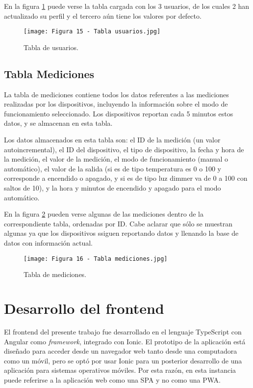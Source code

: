 En la figura \ref{fig:15} puede verse la tabla cargada con los 3 usuarios, de los cuales 2 han actualizado su perfil y el tercero aún tiene los valores por defecto.

\begin{figure}[h]
\centering
\texttt{[image: Figura 15 - Tabla usuarios.jpg]}
\caption[Tabla usuarios]{Tabla de usuarios.}
\label{fig:15}
\end{figure}

\subsection{Tabla Mediciones}

La tabla de mediciones contiene todos los datos referentes a las mediciones realizadas por los dispositivos, incluyendo la información sobre el modo de funcionamiento seleccionado. Los dispositivos reportan cada 5 minutos estos datos, y se almacenan en esta tabla.

Los datos almacenados en esta tabla son: el ID de la medición (un valor autoincremental), el ID del dispositivo, el tipo de dispositivo, la fecha y hora de la medición, el valor de la medición, el modo de funcionamiento (manual o automático), el valor de la salida (si es de tipo temperatura es 0 o 100 y corresponde a encendido o apagado, y si es de tipo luz dimmer va de 0 a 100 con saltos de 10), y la hora y minutos de encendido y apagado para el modo automático.

En la figura \ref{fig:16} pueden verse algunas de las mediciones dentro de la correspondiente tabla, ordenadas por ID. Cabe aclarar que sólo se muestran algunas ya que los dispositivos ssiguen reportando datos y llenando la base de datos con información actual.

\begin{figure}[h]
\centering
\texttt{[image: Figura 16 - Tabla mediciones.jpg]}
\caption[Tabla mediciones]{Tabla de mediciones.}
\label{fig:16}
\end{figure}

\section{Desarrollo del frontend}

El frontend del presente trabajo fue desarrollado en el lenguaje TypeScript con Angular como \textit{framework}, integrado con Ionic. El prototipo de la aplicación está diseñado para acceder desde un navegador web tanto desde una computadora como un móvil, pero se optó por usar Ionic para un posterior desarrollo de una aplicación para sistemas operativos móviles. Por esta razón, en esta instancia puede referirse a la aplicación web como una SPA y no como una PWA.

